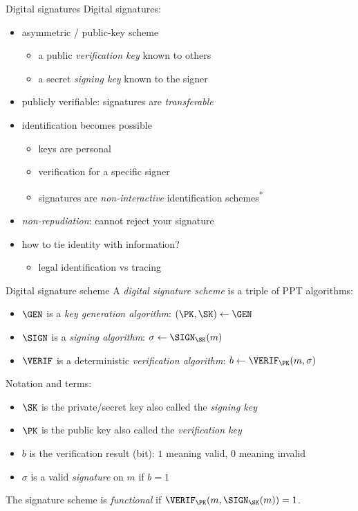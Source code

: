 \begin{frame}{Digital signatures}
  Digital signatures:
  \begin{itemize}[<+(1)->]
    \item asymmetric / public-key scheme
    \begin{itemize}
      \item a public \emph{verification key} known to others
      \item a secret \emph{signing key} known to the signer
    \end{itemize}
    \item publicly verifiable: signatures are \emph{transferable}
    \item identification becomes possible\textsuperscript{\ast}
    \begin{itemize}
      \item keys are personal
      \item verification for a specific signer
      \item signatures are \emph{non-interactive} identification schemes\textsuperscript{*}
    \end{itemize}
    \item \emph{non-repudiation}: cannot reject your signature
    \item how to tie identity with information?
    \begin{itemize}
      \item legal identification vs tracing
    \end{itemize}
  \end{itemize}
\end{frame}

\begin{frame}{Digital signature scheme}
  A \emph{digital signature scheme} is a triple of PPT algorithms:
  \begin{itemize}[<+(1)->]
    \item $\GEN$ is a \emph{key generation algorithm}: $(\PK, \SK)\gets\GEN$
    \item $\SIGN$ is a \emph{signing algorithm}: $\sigma\gets\SIGN_\SK(m)$
    \item $\VERIF$ is a deterministic \emph{verification algorithm}: $b\gets\VERIF_\PK(m, \sigma)$
  \end{itemize}

  \pause
  Notation and terms:
  \begin{itemize}[<+(1)->]
    \item $\SK$ is the private/secret key also called the \emph{signing key}
    \item $\PK$ is the public key also called the \emph{verification key}
    \item $b$ is the verification result (bit): $1$ meaning valid, $0$ meaning invalid
    \item $\sigma$ is a valid \emph{signature} on $m$ if $b = 1$
  \end{itemize}

  \pause
  The signature scheme is \emph{functional} if $\VERIF_\PK(m, \SIGN_\SK(m)) = 1$.
\end{frame}

